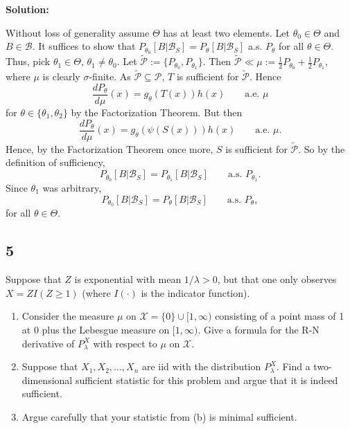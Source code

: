 \documentclass[12pt]{article}
\begin{document}
{\bf Solution:}

Without loss of generality assume $\Theta$ has at least two elements. 
Let $\theta_{0} \in \Theta$ and $B \in \mathcal{B}$. It suffices to show that $P_{\theta_{0}}[B | \mathcal{B}_{S}] = P_{\theta}[B | \mathcal{B}_{S}]$
a.s. $P_{\theta}$ for all $\theta \in \Theta$. Thus, pick $\theta_1 \in \Theta$, $\theta_1 \neq \theta_0$. Let $\tilde{\mathcal{P}} := \{P_{\theta_0}, P_{\theta_1}\}$.
Then $\tilde{\mathcal{P}} \ll \mu := \frac{1}{2}P_{\theta_0} + \frac{1}{2}P_{\theta_1}$, where $\mu$ is clearly $\sigma$-finite.
As $\tilde{\mathcal{P}} \subseteq \mathcal{P}$, $T$ is sufficient for $\tilde{\mathcal{P}}$. Hence
\[
  \frac{dP_{\theta}}{d\mu}(x) = g_{\theta}(T(x))h(x) \qquad \text{a.e. } \mu
\]
for $\theta \in \{\theta_{1}, \theta_2\}$ by the Factorization Theorem. But then
\[
  \frac{dP_{\theta}}{d\mu}(x) = g_{\theta}(\psi(S(x)))h(x) \qquad \text{a.e. } \mu.
\]
Hence, by the Factorization Theorem once more, $S$ is sufficient for $\tilde{\mathcal{P}}$. So by the definition of sufficiency,
\[ P_{\theta_0}[B|\mathcal{B}_{S}] = P_{\theta_1}[B|\mathcal{B}_{S}] \qquad \text{a.s. } P_{\theta_{1}}. \]
Since $\theta_{1}$ was arbitrary,
\[ P_{\theta_{0}}[B | \mathcal{B}_{S}] = P_{\theta}[B | \mathcal{B}_{S}] \qquad \text{a.s. } P_{\theta},\]
for all $\theta \in \Theta$.



\newpage
\subsection*{5}
\begin{tcolorbox}
  Suppose that $Z$ is exponential with mean $1/\lambda>0$, but that one only observes $X = Z I(Z \geq 1)$ (where $I(\cdot)$ is the indicator function).
  \begin{enumerate}[label=(\alph*)]
    \item Consider the measure $\mu$ on $\mathcal{X} = \{0\}\cup [1,\infty)$ consisting of a point mass of 1 at 0 plus the Lebesgue measure on $[1,\infty)$.  Give a formula for the R-N derivative of $P_\lambda^X$ with respect to $\mu$ on $\mathcal{X}$.
    \item Suppose that $X_1,X_2,\ldots,X_n$ are iid with the distribution $P_\lambda^X$.  Find a two-dimensional sufficient statistic for this problem and argue that it is indeed sufficient.
    \item Argue carefully that your statistic from (b) is minimal sufficient.
  \end{enumerate}
\end{tcolorbox}
\end{document}
